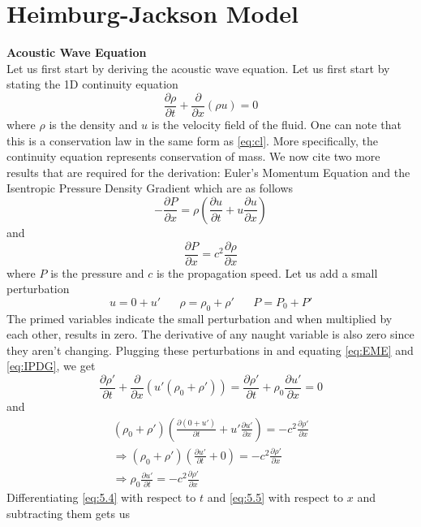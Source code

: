 \documentclass{article}
\newcommand{\pd}[2]{\frac{\partial #1}{\partial #2}}
\newcommand{\twen}{\hspace{20pt}}
\numberwithin{equation}{section}
\begin{document}
\section{Heimburg-Jackson Model}
\textbf{Acoustic Wave Equation}\\
Let us first start by deriving the acoustic wave equation. Let us first start by stating the 1D continuity equation 
\begin{equation}
    \pd{\rho}{t} +\pd{}{x}(\rho u) =0
\end{equation}
where $\rho$ is the density and $u$ is the velocity field of the fluid. One can note that this is a conservation law in the same form as \eqref{eq:cl}. More specifically, the continuity equation represents conservation of mass. We now cite two more results that are required for the derivation: Euler's Momentum Equation and the Isentropic Pressure Density Gradient which are as follows
\begin{equation}
    -\pd{P}{x} = \rho\left(\pd{u}{t}+u\pd{u}{x}\right) \label{eq:EME}
\end{equation}
and 
\begin{equation}
    \pd{P}{x} =c^2 \pd{\rho}{x} \label{eq:IPDG}
\end{equation}
where $P$ is the pressure and $c$ is the propagation speed. Let us add a small perturbation 
\begin{equation*}
    u=0+u' \twen \rho = \rho_0+\rho' \twen P =P_0+P'
\end{equation*}
The primed variables indicate the small perturbation and when multiplied by each other, results in zero. The derivative of any naught variable is also zero since they aren't changing. Plugging these perturbations in and equating \eqref{eq:EME} and \eqref{eq:IPDG}, we get 
\begin{equation}
    \pd{\rho '}{t}+\pd{}{x}(u'(\rho_0+\rho')) = \pd{\rho '}{t} +\rho_0\pd{u'}{x} = 0 \label{eq:5.4}
\end{equation}
and 
\begin{equation}
\begin{split}
    (\rho_0 +\rho')\left( \pd{(0+u')}{t} + u'\pd{u'}{x} \right) = -c^2 \pd{\rho'}{x}\\
    \Rightarrow (\rho_0 +\rho')\left( \pd{u'}{t} + 0 \right) = -c^2 \pd{\rho ' }{x} \\
    \Rightarrow\rho_0 \pd{u'}{t} =-c^2 \pd{\rho'}{x} \label{eq:5.5}
\end{split}
\end{equation}
Differentiating \eqref{eq:5.4} with respect to $t$ and \eqref{eq:5.5} with respect to $x$ and subtracting them gets us 
\end{document}

